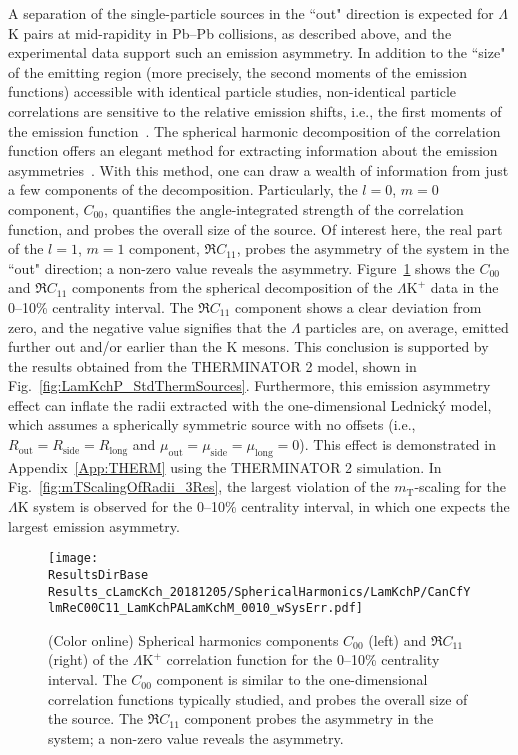 \documentclass[ALICE,manyauthors]{cernphprep}
\newcommand{\ResultsDirBase}{/home/jesse/Analysis/FemtoAnalysis/Results/}
\newcommand{\mt}{$m_{\mathrm{T}}$\xspace}
\newcommand{\Lam}{$\Lambda$\xspace}
\newcommand{\LamK}{$\Lambda$K\xspace}
\newcommand{\LamKchP}{$\Lambda\mathrm{K^{+}}$\xspace}
\begin{document}
A separation of the single-particle sources in the ``out" direction is expected for \LamK pairs at mid-rapidity in Pb--Pb collisions, as described above, and the experimental data support such an emission asymmetry.
In addition to the ``size" of the emitting region (more precisely, the second moments of the emission functions) accessible with identical particle studies, non-identical particle correlations are sensitive to the relative emission shifts, i.e., the first moments of the emission function~\cite{Kisiel:2009eh}.
The spherical harmonic decomposition of the correlation function offers an elegant method for extracting information about the emission asymmetries~\cite{Chajecki:2008vg, PhysRevC.72.054902, Kisiel:2009iw}.
With this method, one can draw a wealth of information from just a few components of the decomposition.
Particularly, the $l=0$, $m=0$ component, $C_{00}$, quantifies the angle-integrated strength of the correlation function, and probes the overall size of the source.
Of interest here, the real part of the $l=1$, $m=1$ component, $\Re C_{11}$, probes the asymmetry of the system in the ``out" direction; a non-zero value reveals the asymmetry. 
Figure~\ref{fig:LamKchP_ReC00C11_0010} shows the $C_{00}$ and $\Re C_{11}$ components from the spherical decomposition of the \LamKchP data in the 0--10\% centrality interval.
The $\Re C_{11}$ component shows a clear deviation from zero, and the negative value signifies that the \Lam particles are, on average, emitted further out and/or earlier than the K mesons.
This conclusion is supported by the results obtained from the THERMINATOR 2 model, shown in Fig.~\ref{fig:LamKchP_StdThermSources}.
Furthermore, this emission asymmetry effect can inflate the radii extracted with the one-dimensional Lednick\'y model, which assumes a spherically symmetric source with no offsets (i.e., $R_{\mathrm{out}} = R_{\mathrm{side}} = R_{\mathrm{long}}$ and $\mu_{\mathrm{out}} = \mu_{\mathrm{side}} = \mu_{\mathrm{long}} = 0$).
This effect is demonstrated in Appendix~\ref{App:THERM} using the THERMINATOR 2 simulation.
In Fig.~\ref{fig:mTScalingOfRadii_3Res}, the largest violation of the \mt-scaling for the \LamK system is observed for the 0--10\% centrality interval, in which one expects the largest emission asymmetry.

\begin{figure}[h!]
  \centering
  \texttt{[image: \\ResultsDirBase Results\_cLamcKch\_20181205/SphericalHarmonics/LamKchP/CanCfYlmReC00C11\_LamKchPALamKchM\_0010\_wSysErr.pdf]}
  \caption[\LamKchP $C_{00}$ and $\Re C_{11}$ Spherical Harmonic Components (0--10\%)]
  {
  (Color online) Spherical harmonics components $C_{00}$ (left) and $\Re C_{11}$ (right) of the \LamKchP correlation function for the 0--10\% centrality interval.  
The $C_{00}$ component is similar to the one-dimensional correlation functions typically studied, and probes the overall size of the source.
The $\Re C_{11}$ component probes the asymmetry in the system; a non-zero value reveals the asymmetry.
  }
  \label{fig:LamKchP_ReC00C11_0010}
\end{figure}
\end{document}
